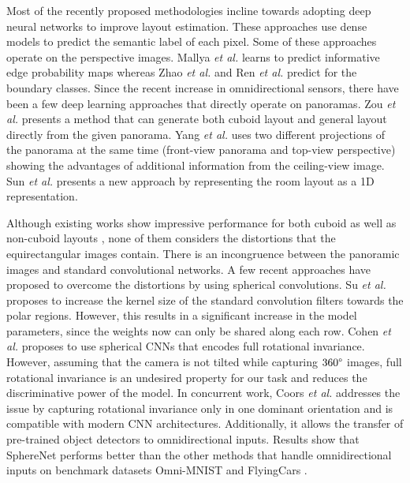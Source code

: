 \documentclass[final]{cvpr}
\begin{document}
Most of the recently proposed methodologies incline towards adopting deep neural networks to improve layout estimation. These approaches use dense models to predict the semantic label of each pixel. Some of these approaches \cite{mallya2015learning, ren2016coarse, zhao2017physics} operate on the perspective images. Mallya \textit{et al.} \cite{mallya2015learning} learns to predict informative edge probability maps whereas Zhao \textit{et al.} and Ren \textit{et al.} \cite{zhao2017physics, ren2016coarse} predict for the boundary classes. Since the recent increase in omnidirectional sensors, there have been a few deep learning approaches that directly operate on panoramas. Zou \textit{et al.} \cite{zou2018layoutnet} presents a method that can generate both cuboid layout and general layout directly from the given panorama. Yang \textit{et al.} \cite{yang2019dula} uses two different projections of the panorama at the same time (front-view panorama and top-view perspective) showing the advantages of additional information from the ceiling-view image. Sun \textit{et al.} \cite{sun2019horizonnet} presents a new approach by representing the room layout as a 1D representation.

Although existing works show impressive performance for both cuboid as well as non-cuboid layouts \cite{sun2019horizonnet, yang2019dula, zou2018layoutnet}, none of them considers the distortions that the equirectangular images contain. There is an incongruence between the panoramic images and standard convolutional networks. A few recent approaches have proposed to overcome the distortions by using spherical convolutions. Su \textit{et al.} \cite{su2017learning} proposes to increase the kernel size of the standard convolution filters towards the polar regions. However, this results in a significant increase in the model parameters, since the weights now can only be shared along each row. Cohen \textit{et al.} \cite{cohen2018spherical} proposes to use spherical CNNs that encodes full rotational invariance. However, assuming that the camera is not tilted while capturing $360\degree$ images, full rotational invariance is an undesired property for our task and reduces the discriminative power of the model. In concurrent work, Coors \textit{et al.} \cite{coors2018spherenet} addresses the issue by capturing rotational invariance only in one dominant orientation and is compatible with modern CNN architectures. Additionally, it allows the transfer of pre-trained object detectors to omnidirectional inputs. Results show that SphereNet \cite{coors2018spherenet} performs better than the other methods that handle omnidirectional inputs on benchmark datasets Omni-MNIST and FlyingCars \cite{coors2018spherenet}.
\end{document}
